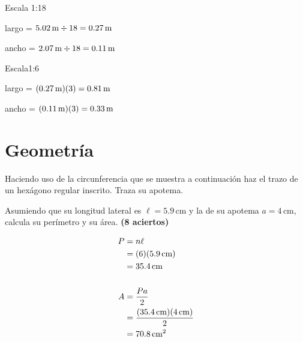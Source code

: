 \documentclass[11pt]{article}
\begin{document}
\begin{multicols}{2}
Escala 1:18

largo = $5.02\text{\,m} \div 18 = 0.27\text{\,m}$

ancho = $2.07\text{\,m} \div 18 = 0.11\text{\,m}$

Escala1:6

largo = $(0.27\text{\,m})(3) = 0.81\text{\,m}$

ancho = $(0.11\text{\,m})(3) = 0.33\text{\,m}$
\end{multicols}

\vspace{5mm}
\section{Geometr\'ia}
Haciendo uso de la circunferencia que se muestra a continuaci\'on haz el trazo
de un hex\'agono regular inscrito. Traza su apotema. 

Asumiendo que su longitud lateral
es $\ell=5.9$\,cm y la de su apotema $a=4$\,cm, calcula su per\'imetro y su
\'area. \hfill \textbf{(8 aciertos)}

\vspace{3mm}
\begin{minipage}{0.75\linewidth}
\end{minipage}\hspace{-2.5cm}
\begin{minipage}{0.3\linewidth}
\begin{align*}
P &= n \ell \\
  &= (6)(5.9\text{\,cm})  \\
  &= 35.4\text{\,cm} \\
\\
A &= \frac{Pa}{2} \\
  &= \frac{(35.4\text{\,cm})(4\text{\,cm})}{2} \\
  &= 70.8\text{\,cm}^{2}
\end{align*}
\end{minipage}
\end{document}
